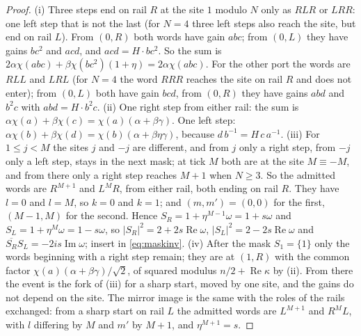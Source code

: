\begin{proof}
(i) Three steps end on rail $R$ at the site $1$ modulo $N$ only as $RLR$ or $LRR$: one left step that is not the last (for $N=4$ three left steps also reach the site, but end on rail $L$). From $(0,R)$ both words have gain $abc$; from $(0,L)$ they have gains $bc^{2}$ and $acd$, and $acd=H\cdot bc^{2}$. So the sum is $2\alpha\chi(abc)+\beta\chi(bc^{2})(1+\eta)=2\alpha\chi(abc)$. For the other port the words are $RLL$ and $LRL$ (for $N=4$ the word $RRR$ reaches the site on rail $R$ and does not enter); from $(0,L)$ both have gain $bcd$, from $(0,R)$ they have gains $abd$ and $b^{2}c$ with $abd=H\cdot b^{2}c$.
(ii) One right step from either rail: the sum is $\alpha\chi(a)+\beta\chi(c)=\chi(a)(\alpha+\beta\gamma)$. One left step: $\alpha\chi(b)+\beta\chi(d)=\chi(b)(\alpha+\beta\eta\gamma)$, because $d\,b^{-1}=H\,c\,a^{-1}$.
(iii) For $1\le j<M$ the sites $j$ and $-j$ are different, and from $j$ only a right step, from $-j$ only a left step, stays in the next mask; at tick $M$ both are at the site $M\equiv-M$, and from there only a right step reaches $M+1$ when $N\ge3$. So the admitted words are $R^{M+1}$ and $L^{M}R$, from either rail, both ending on rail $R$. They have $l=0$ and $l=M$, so $k=0$ and $k=1$; and $(m,m')=(0,0)$ for the first, $(M-1,M)$ for the second. Hence $S_R=1+\eta^{M-1}\omega=1+s\omega$ and $S_L=1+\eta^{M}\omega=1-s\omega$, so $|S_R|^{2}=2+2s\operatorname{Re}\omega$, $|S_L|^{2}=2-2s\operatorname{Re}\omega$ and $\overline{S_R}S_L=-2is\operatorname{Im}\omega$; insert in \eqref{eq:maskinv}.
(iv) After the mask $S_1=\{1\}$ only the words beginning with a right step remain; they are at $(1,R)$ with the common factor $\chi(a)(\alpha+\beta\gamma)/\sqrt2$, of squared modulus $n/2+\operatorname{Re}\kappa$ by (ii). From there the event is the fork of (iii) for a sharp start, moved by one site, and the gains do not depend on the site. The mirror image is the same with the roles of the rails exchanged: from a sharp start on rail $L$ the admitted words are $L^{M+1}$ and $R^{M}L$, with $l$ differing by $M$ and $m'$ by $M+1$, and $\eta^{M+1}=s$.
\end{proof}

